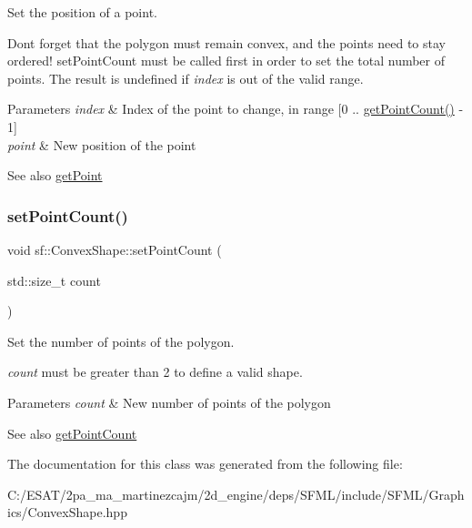 Set the position of a point. 

Don\textquotesingle{}t forget that the polygon must remain convex, and the points need to stay ordered! set\+Point\+Count must be called first in order to set the total number of points. The result is undefined if {\itshape index} is out of the valid range.


\begin{DoxyParams}{Parameters}
{\em index} & Index of the point to change, in range \mbox{[}0 .. \hyperlink{classsf_1_1_convex_shape_a0c54b8d48fe4e13414f6e667dbfc22a3}{get\+Point\+Count()} -\/ 1\mbox{]} \\
\hline
{\em point} & New position of the point\\
\hline
\end{DoxyParams}
\begin{DoxySeeAlso}{See also}
\hyperlink{classsf_1_1_convex_shape_a72a97bc426d8daf4d682a20fcb7f3fe7}{get\+Point} 
\end{DoxySeeAlso}
\mbox{\label{classsf_1_1_convex_shape_a56e6e79ade6dd651cc1a0e39cb68deae}} 
\subsubsection{\texorpdfstring{set\+Point\+Count()}{setPointCount()}}
{\footnotesize\ttfamily void sf\+::\+Convex\+Shape\+::set\+Point\+Count (\begin{DoxyParamCaption}\item[{std\+::size\+\_\+t}]{count }\end{DoxyParamCaption})}



Set the number of points of the polygon. 

{\itshape count} must be greater than 2 to define a valid shape.


\begin{DoxyParams}{Parameters}
{\em count} & New number of points of the polygon\\
\hline
\end{DoxyParams}
\begin{DoxySeeAlso}{See also}
\hyperlink{classsf_1_1_convex_shape_a0c54b8d48fe4e13414f6e667dbfc22a3}{get\+Point\+Count} 
\end{DoxySeeAlso}


The documentation for this class was generated from the following file\+:\begin{DoxyCompactItemize}
\item 
C\+:/\+E\+S\+A\+T/2pa\+\_\+ma\+\_\+martinezcajm/2d\+\_\+engine/deps/\+S\+F\+M\+L/include/\+S\+F\+M\+L/\+Graphics/Convex\+Shape.\+hpp\end{DoxyCompactItemize}
